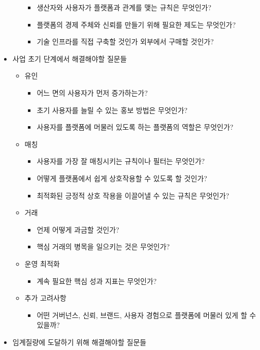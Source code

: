 \begin{itemize}
\begin{itemize}
\begin{itemize}
		\item 생산자와 사용자가 플랫폼과 관계를 맺는 규칙은 무엇인가?
		\item 플랫폼의 경제 주체와 신뢰를 만들기 위해 필요한 제도는 무엇인가?
		\item 기술 인프라를 직접 구축할 것인가 외부에서 구매할 것인가?
		\end{itemize}
	\end{itemize}	
\item 사업 초기 단계에서 해결해야할 질문들 \cite[ch. 8]{Reillier:2017tt}
	\begin{itemize}
	\item 유인
		\begin{itemize}
		\item 어느 면의 사용자가 먼저 증가하는가?
		\item 초기 사용자를 늘릴 수 있는 홍보 방법은 무엇인가?
		\item 사용자를 플랫폼에 머물러 있도록 하는 플랫폼의 역할은 무엇인가?
		\end{itemize}
	\item 매칭
		\begin{itemize}
		\item 사용자를 가장 잘 매칭시키는 규칙이나 필터는 무엇인가?
		\item 어떻게 플랫폼에서 쉽게 상호작용할 수 있도록 할 것인가?
		\item 최적화된 긍정적 상호 작용을 이끌어낼 수 있는 규칙은 무엇인가?
		\end{itemize}	
	\item 거래
		\begin{itemize}
		\item 언제 어떻게 과금할 것인가?
		\item 핵심 거래의 병목을 일으키는 것은 무엇인가?
		\end{itemize}	
	\item 운영 최적화	
		\begin{itemize}
		\item 계속 필요한 핵심 성과 지표는 무엇인가?
		\end{itemize}	
	\item 추가 고려사항
		\begin{itemize}
		\item 어떤 거버넌스, 신뢰, 브랜드, 사용자 경험으로 플랫폼에 머물러 있게 할 수 있을까?
		\end{itemize}
	\end{itemize}	
\item 임계질량에 도달하기 위해 해결해야할 질문들 	\cite[ch. 9]{Reillier:2017tt}

\end{itemize}
